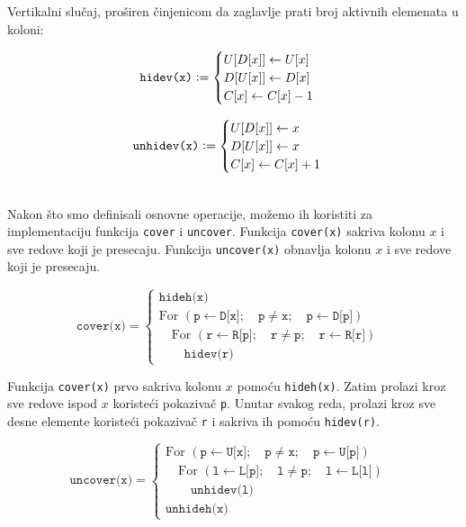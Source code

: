 \documentclass[a4paper]{article}
\begin{document}
{Vertikalni slučaj, proširen činjenicom da zaglavlje prati broj aktivnih elemenata u koloni:\\
  \begin{minipage}{0.45\textwidth}
  \[
  \texttt{hidev(x)} \vcentcolon =
  \begin{cases}
    U[D[x]] \gets U[x] \\
    D[U[x]] \gets D[x] \\
    C[x] \gets C[x] - 1
  \end{cases}
  \]
\end{minipage}
\begin{minipage}{0.45\textwidth}
  \[
  \texttt{unhidev(x)} \vcentcolon =
  \begin{cases}
    U[D[x]] \gets x \\
    D[U[x]] \gets x \\
    C[x] \gets C[x] + 1
  \end{cases}
  \]
  \end{minipage}\\

  Nakon što smo definisali osnovne operacije, možemo ih koristiti za implementaciju funkcija \texttt{cover} i
  \texttt{uncover}. Funkcija \texttt{cover(x)} sakriva kolonu \(x\) i sve redove koji je presecaju. Funkcija
  \texttt{uncover(x)} obnavlja kolonu \(x\) i sve redove koji je presecaju.

  \[
  \texttt{cover(x)} =
  \begin{cases}
  \texttt{hideh(x)} & \\
  \text{For } (\texttt{p} \gets \texttt{D[x]}; \quad \texttt{p} \neq \texttt{x}; \quad \texttt{p} \gets \texttt{D[p]}) & \\
  \quad \text{For } (\texttt{r} \gets \texttt{R[p]}; \quad \texttt{r} \neq \texttt{p}; \quad \texttt{r} \gets \texttt{R[r]}) & \\
  \quad \quad \texttt{hidev(r)} &
  \end{cases}
  \]
  
  Funkcija \texttt{cover(x)} prvo sakriva kolonu \(x\) pomoću \texttt{hideh(x)}. Zatim prolazi kroz sve redove ispod
  \(x\) koristeći pokazivač \texttt{p}. Unutar svakog reda, prolazi kroz sve desne elemente koristeći pokazivač
  \texttt{r} i sakriva ih pomoću \texttt{hidev(r)}.
  
  \[
  \texttt{uncover(x)} =
  \begin{cases}
  \text{For } (\texttt{p} \gets \texttt{U[x]}; \quad \texttt{p} \neq \texttt{x}; \quad \texttt{p} \gets \texttt{U[p]}) & \\
  \quad \text{For } (\texttt{l} \gets \texttt{L[p]}; \quad \texttt{l} \neq \texttt{p}; \quad \texttt{l} \gets \texttt{L[l]}) & \\
  \quad \quad \texttt{unhidev(l)} & \\
  \texttt{unhideh(x)} &
  \end{cases}
  \]
  
}
\end{document}
